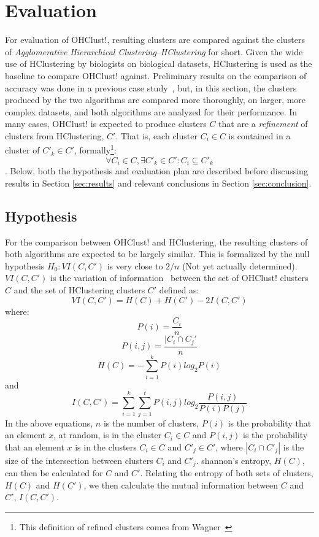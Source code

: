 \documentclass[12pt]{ucthesis}
\begin{document}
\chapter{Evaluation}\label{chap:evaluation}
   For evaluation of OHClust!, resulting clusters are compared against the
   clusters of \textit{Agglomerative Hierarchical
   Clustering}--\textit{HClustering} for short. Given the wide use of
   HClustering by biologists on biological datasets, HClustering is used as
   the baseline to compare OHClust! against. Preliminary results on the
   comparison of accuracy was done in a previous case
   study~\cite{Montana:ChronoCluster}, but, in this section, the
   clusters produced by the two algorithms are compared more thoroughly, on larger, more
   complex datasets, and both algorithms are analyzed for their performance. In many
   cases, OHClust! is expected to produce clusters $C$ that are a
   \textit{refinement} of clusters from HClustering, $C'$. That is, each
   cluster $C_i \in C$ is contained in a cluster of $C'_k \in C'$,
   formally\footnote{This definition of refined clusters comes from
   Wagner~\cite{Wagner:Overview}}:
   $$\forall C_i \in C, \exists C'_k \in C' : C_i \subseteq C'_k$$.
   Below, both the hypothesis and evaluation plan are described before discussing
   results in Section \ref{sec:results} and relevant conclusions in Section
   \ref{sec:conclusion}.

   \section{Hypothesis}\label{sec:eval_goals}
      For the comparison between OHClust! and HClustering, the resulting
      clusters of both algorithms are expected to be largely similar. This is
      formalized by the null hypothesis $H_0: VI(C, C')$ is very close to $2/n$
      (Not yet actually determined). $VI(C, C')$ is the variation of
      information~\cite{Halkidi:Validation} between the set of OHClust!
      clusters $C$ and the set of HClustering clusters $C'$ defined as:
      $$VI(C, C') = H(C) + H(C') - 2I(C, C')$$
      where:
      $$P(i) = \frac{C_i}{n}$$
      $$P(i,j) = \frac{| C_i \cap C_j'}{n}$$
      $$H(C) = -\sum_{i=1}^{k}P(i)log_2P(i)$$
      and
      $$I(C, C') = \sum_{i=1}^{k}\sum_{j=1}^{t}P(i,j)log_2\frac{P(i,j)}{P(i)P(j)}$$
      In the above equations, $n$ is the number of clusters, $P(i)$ is the
      probability that an element $x$, at random, is in the cluster $C_i \in C$
      and $P(i, j)$ is the probability that an element $x$ is in the clusters
      $C_i \in C$ and $C'_j \in C'$, where $|C_i \cap C'_j|$ is the size of the
      intersection between clusters $C_i$ and $C'_j$. shannon's entropy,
      $H(C)$, can then be calculated for $C$ and $C'$. Relating the entropy of
      both sets of clusters, $H(C)$ and $H(C')$, we then calculate the mutual
      information between $C$ and $C'$, $I(C, C')$.
\end{document}
